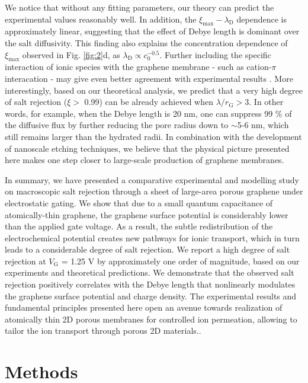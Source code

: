 \documentclass[journal=langd5,email=true, hyperref=true, keywords=false]{achemso}
\begin{document}
We notice that
without any fitting parameters, our theory can predict the
experimental values reasonably well.  In addition, the
$\xi_{\mathrm{max}}-\lambda_{\mathrm{D}}$ dependence is approximately
linear, suggesting that the effect of Debye length is dominant over
the salt diffusivity. This finding also explains the concentration
dependence of $\xi_{\mathrm{max}}$ observed in Fig. \ref{fig:2}d, as
$\lambda_{\mathrm{D}} \propto c_{0}^{-0.5}$. Further including the
specific interaction of ionic species with the graphene membrane
{- such as cation-$\pi$ interacation \cite{shi2013ion}} - may give even better agreement with experimental
results \cite{Ghosh_2018}. More interestingly, based on our theoretical analysis, we
predict that a very high degree of salt rejection ($\xi>$ 0.99) can be
already achieved when $\lambda / r_{\mathrm{G}}>$3. In other words,
for example, when the Debye length is 20 nm, one can suppress 99 \% of
the diffusive flux by further reducing the pore radius down to
$\sim$5-6 nm, which still remains larger than the hydrated radii. In
combination with the development of nanoscale etching techniques, we
believe that the physical picture presented here makes one step closer
to large-scale production of graphene membranes.

In summary, we have presented a comparative experimental and modelling
study on macroscopic salt rejection through a sheet of large-area
porous graphene under electrostatic gating. We show that due to a
small quantum capacitance of atomically-thin graphene, the graphene
surface potential is considerably lower than the applied gate
voltage. As a result, the subtle redistribution of the electrochemical
potential creates new pathways for ionic transport, which in turn
leads to a considerable degree of salt rejection. We report a high
degree of salt rejection at $V_{\mathrm{G}}$ = 1.25 V by approximately
one order of magnitude, based on our experiments and theoretical
predictions. We demonstrate that the observed salt
rejection positively correlates with the Debye length that nonlinearly
modulates the graphene surface potential and charge density. The
experimental results and fundamental principles presented here open an
avenue towards realization of atomically thin 2D porous membranes for
{ controlled ion permeation, allowing to tailor the ion transport through porous 2D materials.}.

\section*{Methods}
\label{sec:methods}
\end{document}
